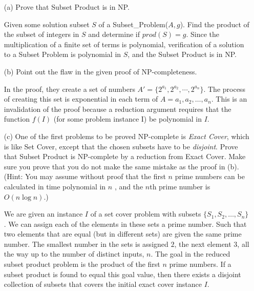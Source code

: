 \documentclass[11pt]{article}
\begin{document}
\begin{itemize}

\item[(a)] Prove that Subset Product is in NP.

  Given some solution subset $S$ of a Subset\_Problem($A,g$). Find the 
  product of the subset of integers in $S$ and determine if $prod(S)=g$. 
  Since the multiplication of a finite set of terms is polynomial,
  verification of a solution to a Subset Problem is polynomial in
  $S$, and the Subset Product is in NP.

\item[(b)] Point out the flaw in the given proof of NP-completeness.

  In the proof, they create a set of numbers $A'=\{2^{a_1},2^{a_2},\cdots,2^{a_n}\}$.
  The process of creating this set is exponential in each term of 
  $A={a_1,a_2,\ldots,a_n}$. This is an invalidation of the proof because 
  a reduction argument requires that the function $f(I)$
  (for some problem instance I) be polynomial in $I$. 

\item[(c)] One of the first problems to be proved NP-complete is 
  \emph{Exact Cover}, which is like Set Cover, except that the chosen
  subsets have to be \emph{disjoint}. Prove that Subset Product is NP-complete
  by a reduction from Exact Cover. Make sure you prove that you do not make 
  the same mistake as the proof in (b). (Hint: You may assume without proof 
  that the first $n$ prime numbers can be calculated in time polynomial in 
  $n$ , and the $n$th prime number is $O(n\log n)$.) 

  We are given an instance $I$ of a set cover problem with subsets $\{S_1,
  S_2,\ldots,S_n\}$. We can assign each of the elements in these sets 
  a prime number. Such that two elements that are equal (but in different 
  sets) are given the same prime number. 
  The smallest number in the sets is assigned $2$, the 
  next element $3$, all the way up to the number of distinct inputs, $n$. 
  The goal 
  in the reduced subset product problem is the product of the first $n$ prime
  numbers. If a subset product is found to equal this goal value, then there 
  exists a disjoint collection of subsets that covers the initial exact cover
  instance $I$.
  
  
  
\label{pg:end-of-p3}



\end{itemize}
\end{document}
